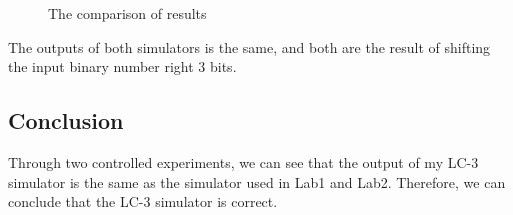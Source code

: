 \documentclass[UTF8,a4paper,12pt]{ctexart}
\begin{document}
\begin{figure}[H]   %
\centering
{}
    \hspace{0.2cm}      %
\centering
{}
\caption{The comparison of results}
\end{figure}

The outputs of both simulators is the same, and both are the result of shifting the input binary number right 3 bits.

\subsection{Conclusion}

Through two controlled experiments, we can see that the output of my LC-3 simulator is the same as the simulator used in Lab1 and Lab2. Therefore, we can conclude that the LC-3 simulator is correct.
 
\end{document}
